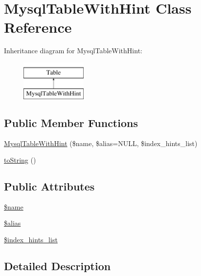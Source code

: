 \hypertarget{classMysqlTableWithHint}{\section{Mysql\-Table\-With\-Hint Class Reference}
\label{classMysqlTableWithHint}
}
Inheritance diagram for Mysql\-Table\-With\-Hint\-:\begin{figure}[H]
\begin{center}
\leavevmode
\includegraphics[height=2.000000cm]{classMysqlTableWithHint}
\end{center}
\end{figure}
\subsection*{Public Member Functions}
\begin{DoxyCompactItemize}
\item 
\hyperlink{classMysqlTableWithHint_aa77b8f9ab560a504ab1e24786f77f3a7}{Mysql\-Table\-With\-Hint} (\$name, \$alias=N\-U\-L\-L, \$index\-\_\-hints\-\_\-list)
\item 
\hyperlink{classMysqlTableWithHint_ad4123d7369e2e100a6189767d3d7e78b}{to\-String} ()
\end{DoxyCompactItemize}
\subsection*{Public Attributes}
\begin{DoxyCompactItemize}
\item 
\hyperlink{classMysqlTableWithHint_a38c6eb1620ea15d06902d2fafb991776}{\$name}
\item 
\hyperlink{classMysqlTableWithHint_a71f2f396bdbde2b55444e8f142c31816}{\$alias}
\item 
\hyperlink{classMysqlTableWithHint_ac389d7382100dd008addab6fbbbe0032}{\$index\-\_\-hints\-\_\-list}
\end{DoxyCompactItemize}


\subsection{Detailed Description}


